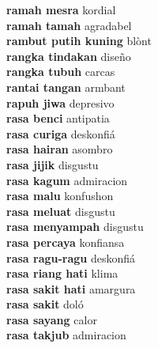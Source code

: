 \textbf{ ramah mesra  } kordial \\
\textbf{ ramah tamah  } agradabel \\
\textbf{ rambut putih kuning  } blònt \\
\textbf{ rangka tindakan  } diseño \\
\textbf{ rangka tubuh  } carcas \\
\textbf{ rantai tangan  } armbant \\
\textbf{ rapuh jiwa  } depresivo \\
\textbf{ rasa benci  } antipatia \\
\textbf{ rasa curiga  } deskonfiá \\
\textbf{ rasa hairan  } asombro \\
\textbf{ rasa jijik  } disgustu \\
\textbf{ rasa kagum  } admiracion \\
\textbf{ rasa malu  } konfushon \\
\textbf{ rasa meluat  } disgustu \\
\textbf{ rasa menyampah  } disgustu \\
\textbf{ rasa percaya  } konfiansa \\
\textbf{ rasa ragu-ragu  } deskonfiá \\
\textbf{ rasa riang hati  } klima \\
\textbf{ rasa sakit hati  } amargura \\
\textbf{ rasa sakit  } doló \\
\textbf{ rasa sayang  } calor \\
\textbf{ rasa takjub  } admiracion \\
